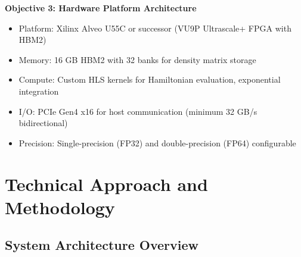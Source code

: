 \documentclass[12pt,a4paper]{article}
\begin{document}
\textbf{Objective 3: Hardware Platform Architecture}
\begin{itemize}[noitemsep]
    \item Platform: Xilinx Alveo U55C or successor (VU9P Ultrascale+ FPGA with HBM2)
    \item Memory: 16 GB HBM2 with 32 banks for density matrix storage
    \item Compute: Custom HLS kernels for Hamiltonian evaluation, exponential integration
    \item I/O: PCIe Gen4 x16 for host communication (minimum 32 GB/s bidirectional)
    \item Precision: Single-precision (FP32) and double-precision (FP64) configurable
\end{itemize}

\newpage
\section{Technical Approach and Methodology}

\subsection{System Architecture Overview}
\end{document}
